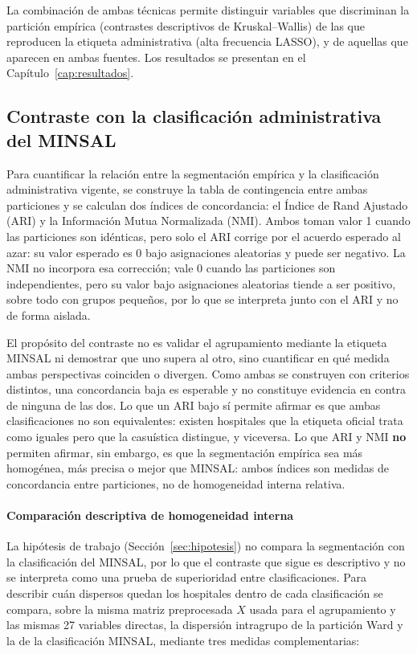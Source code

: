 La combinación de ambas técnicas permite distinguir variables que discriminan
la partición empírica (contrastes descriptivos de Kruskal--Wallis) de las que reproducen la
etiqueta administrativa (alta frecuencia LASSO), y de aquellas que aparecen en
ambas fuentes. Los resultados se presentan en el Capítulo~\ref{cap:resultados}.

\subsection{Contraste con la clasificación administrativa del MINSAL}
\label{sec:contraste-minsal}

Para cuantificar la relación entre la segmentación empírica y la clasificación
administrativa vigente, se construye la tabla de contingencia entre ambas
particiones y se calculan dos índices de concordancia: el Índice de Rand
Ajustado (ARI) y la Información Mutua Normalizada (NMI). Ambos toman valor 1
cuando las particiones son idénticas, pero solo el ARI corrige por el acuerdo
esperado al azar: su valor esperado es 0 bajo asignaciones aleatorias y puede
ser negativo. La NMI no incorpora esa corrección; vale 0 cuando las particiones
son independientes, pero su valor bajo asignaciones aleatorias tiende a ser
positivo, sobre todo con grupos pequeños, por lo que se interpreta junto con el
ARI y no de forma aislada.

El propósito del contraste no es validar el agrupamiento mediante la etiqueta
MINSAL ni demostrar que uno supera al otro, sino cuantificar en qué medida ambas
perspectivas coinciden o divergen. Como ambas se construyen con criterios
distintos, una concordancia baja es esperable y no constituye evidencia en contra de
ninguna de las dos. Lo que un ARI bajo sí permite afirmar es que ambas
clasificaciones no son equivalentes: existen hospitales que la etiqueta oficial
trata como iguales pero que la casuística distingue, y viceversa. Lo que ARI y
NMI \textbf{no} permiten afirmar, sin embargo, es que la segmentación empírica
sea más homogénea, más precisa o mejor que MINSAL: ambos índices son medidas de
concordancia entre particiones, no de homogeneidad interna relativa.

\paragraph{Comparación descriptiva de homogeneidad interna}
\label{sec:comparacion-homogeneidad}

La hipótesis de trabajo (Sección~\ref{sec:hipotesis}) no compara la
segmentación con la clasificación del MINSAL, por lo que el contraste que sigue
es descriptivo y no se interpreta como una prueba de superioridad entre
clasificaciones. Para describir cuán dispersos quedan los hospitales dentro de
cada clasificación se compara, sobre la misma matriz preprocesada
$X$ usada para el agrupamiento y las mismas 27 variables directas, la dispersión
intragrupo de la partición Ward y la de la clasificación MINSAL, mediante tres
medidas complementarias:

